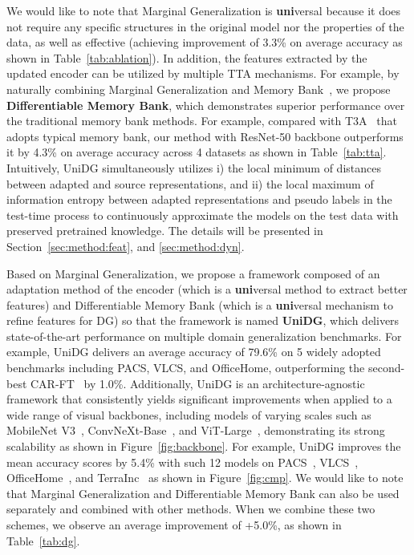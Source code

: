 \documentclass{article} \usepackage{iclr2024_conference,times}
\begin{document}
We would like to note that Marginal Generalization is \textbf{uni}versal because it does not require any specific structures in the original model nor the properties of the data, as well as effective (achieving improvement of 3.3\% on average accuracy as shown in Table~\ref{tab:ablation}). In addition, the features extracted by the updated encoder can be utilized by multiple TTA mechanisms. For example, by naturally combining Marginal Generalization and Memory Bank~\citep{wu2018unsupervised}, we propose \textbf{Differentiable Memory Bank}, which demonstrates superior performance over the traditional memory bank methods. For example, compared with T3A~\citep{iwasawa2021test} that adopts typical memory bank, our method with ResNet-50 backbone outperforms it by 4.3\% on average accuracy across 4 datasets as shown in Table~\ref{tab:tta}. Intuitively, UniDG simultaneously utilizes i) the local minimum of distances between adapted and source representations, and ii) the local maximum of information entropy between adapted representations and pseudo labels in the test-time process to continuously approximate the models on the test data with preserved pretrained knowledge. 
The details will be presented in Section~\ref{sec:method:feat}, and \ref{sec:method:dyn}.

Based on Marginal Generalization, we propose a framework composed of an adaptation method of the encoder (which is a \textbf{uni}versal method to extract better features) and Differentiable Memory Bank (which is a \textbf{uni}versal mechanism to refine features for DG) so that the framework is named \textbf{UniDG}, which delivers state-of-the-art performance on multiple domain generalization benchmarks. For example, UniDG delivers an average accuracy of 79.6\% on 5 widely adopted benchmarks including PACS, VLCS, and OfficeHome, outperforming the second-best CAR-FT~\citep{mao2022context} by 1.0\%. Additionally, UniDG is an architecture-agnostic framework that consistently yields significant improvements when applied to a wide range of visual backbones, including models of varying scales such as MobileNet V3~\citep{howard2019searching}, ConvNeXt-Base~\citep{liu2022convnet}, and ViT-Large~\citep{dosovitskiy2020image}, demonstrating its strong scalability as shown in Figure~\ref{fig:backbone}. For example, UniDG improves the mean accuracy scores by 5.4\% with such 12 models on PACS~\citep{torralba2011unbiased}, VLCS~\citep{li2017deeper}, OfficeHome~\citep{venkateswara2017deep}, and TerraInc~\citep{beery2018recognition} as shown in Figure~\ref{fig:cmp}. We would like to note that Marginal Generalization and Differentiable Memory Bank can also be used separately and combined with other methods. When we combine these two schemes, we observe an average improvement of +5.0\%, as shown in Table~\ref{tab:dg}.
   
\end{document}
